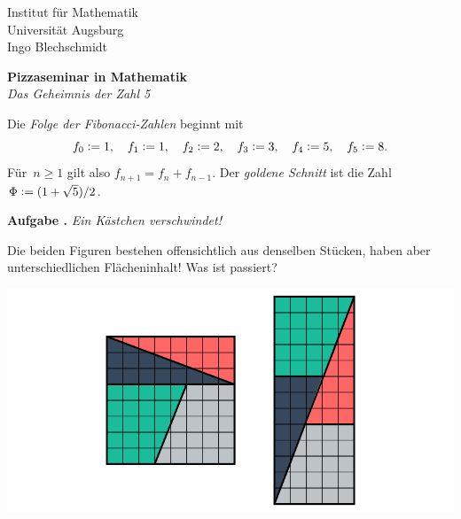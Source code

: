 \documentclass[a4paper,ngerman,twoside]{scrartcl}
\newcommand{\defeq}{\vcentcolon=}
\newlength{\aufgabenskip}
\newcounter{aufgabennummer}
\newenvironment{aufgabe}[1]{
  \addtocounter{aufgabennummer}{1}
  \textbf{Aufgabe \theaufgabennummer.} \emph{#1} \par
}{\vspace{\aufgabenskip}}
\begin{document}
\thispagestyle{empty}
Institut für Mathematik \\
Universität Augsburg \\
Ingo Blechschmidt

\begin{center}
  \textbf{Pizzaseminar in Mathematik} \\
  \emph{Das Geheimnis der Zahl 5}
\end{center}
\vspace{1em}

Die \emph{Folge der Fibonacci-Zahlen} beginnt mit
\[
  f_0 \defeq 1, \quad
  f_1 \defeq 1, \quad
  f_2 \defeq 2, \quad
  f_3 \defeq 3, \quad
  f_4 \defeq 5, \quad
  f_5 \defeq 8.
\]
Für~$n \geq 1$ gilt also $f_{n+1} = f_n + f_{n-1}$. Der \emph{goldene Schnitt}
ist die Zahl~$\Phi \defeq (1+\sqrt{5})/2$.
\vspace{1em}

\begin{aufgabe}{Ein Kästchen verschwindet!}
Die beiden Figuren bestehen offensichtlich aus denselben Stücken, haben
aber unterschiedlichen Flächeninhalt! Was ist passiert?
\begin{center}
  \includegraphics[scale=0.3]{ein-kaestchen-verschwindet}
\end{center}
\end{aufgabe}
\end{document}

